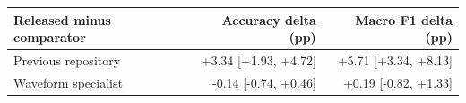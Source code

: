 \begin{tabular}{lrr}
\toprule
Released minus comparator & Accuracy delta (pp) & Macro F1 delta (pp) \\
\midrule
Previous repository & +3.34 [+1.93, +4.72] & +5.71 [+3.34, +8.13] \\
Waveform specialist & -0.14 [-0.74, +0.46] & +0.19 [-0.82, +1.33] \\
\bottomrule
\end{tabular}
